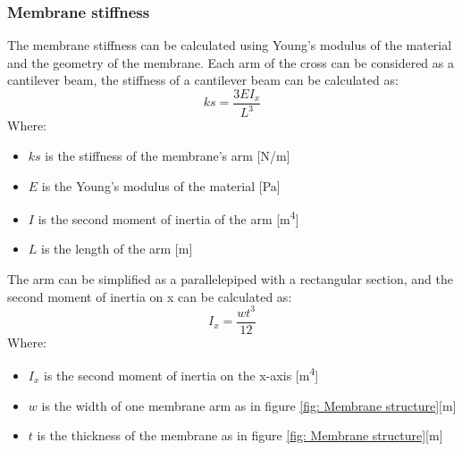 \subsubsection{Membrane stiffness}
The membrane stiffness can be calculated using Young's modulus of the material and the geometry of the membrane.
Each arm of the cross can be considered as a cantilever beam, the stiffness of a cantilever beam can be calculated as:
\begin{equation}
    ks = \frac{3 E I_x}{L^3}
\end{equation}
Where:
\begin{itemize}
    \item $ks$ is the stiffness of the membrane's arm [N/m]
    \item $E$ is the Young's modulus of the material [Pa]
    \item $I$ is the second moment of inertia of the arm [m\textsuperscript{4}]
    \item $L$ is the length of the arm [m]
\end{itemize}

The arm can be simplified as a parallelepiped with a rectangular section, and the second moment of inertia on x can be calculated as:
\begin{equation}
    I_x = \frac{w t^3}{12}
\end{equation}
Where:
\begin{itemize}
    \item $I_x$ is the second moment of inertia on the x-axis [m\textsuperscript{4}]
    \item $w$ is the width of one membrane arm as in figure \ref{fig: Membrane structure}[m]
    \item $t$ is the thickness of the membrane as in figure \ref{fig: Membrane structure}[m]
\end{itemize}

